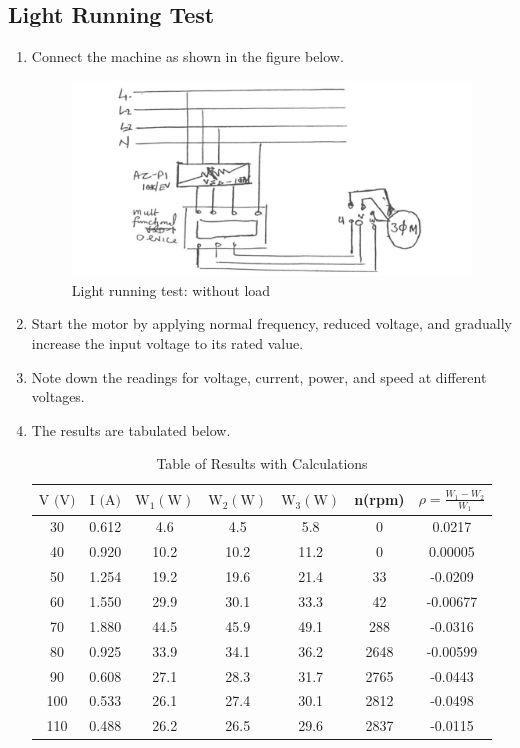 \documentclass[12pt,a4paper]{report}
\begin{document}
\subsection{Light Running Test}
\begin{enumerate}
    \item Connect the machine as shown in the figure below.
    \begin{figure}[H]
        \centering
        \includegraphics[width=\linewidth]{figure_5_5.jpeg}
        \caption{Light running test: without load}
        \label{fig_5}
    \end{figure}
    \item Start the motor by applying normal frequency, reduced voltage, and gradually increase the input voltage to its rated value.
    \item Note down the readings for voltage, current, power, and speed at different voltages.
    \item The results are tabulated below.

\begin{table}[H]
    \centering
    \caption{Table of Results with Calculations}
    \begin{tabular}{|c|c|c|c|c|c|c|}
    \hline
    \(\text{V (V)}\) & \(\text{I (A)}\) & \(\text{W}_1 (\text{W})\) & \(\text{W}_2 (\text{W})\) & \(\text{W}_3 (\text{W})\) & n(rpm) & \(\rho = \frac{W_1 - W_2}{W_1}\) \\ \hline
    30  & 0.612  & 4.6  & 4.5  & 5.8  & 0    & 0.0217   \\ \hline
    40  & 0.920  & 10.2 & 10.2 & 11.2 & 0    & 0.00005  \\ \hline
    50  & 1.254  & 19.2 & 19.6 & 21.4 & 33   & -0.0209  \\ \hline
    60  & 1.550  & 29.9 & 30.1 & 33.3 & 42   & -0.00677 \\ \hline
    70  & 1.880  & 44.5 & 45.9 & 49.1 & 288  & -0.0316  \\ \hline
    80  & 0.925  & 33.9 & 34.1 & 36.2 & 2648 & -0.00599 \\ \hline
    90  & 0.608  & 27.1 & 28.3 & 31.7 & 2765 & -0.0443  \\ \hline
    100 & 0.533  & 26.1 & 27.4 & 30.1 & 2812 & -0.0498  \\ \hline
    110 & 0.488  & 26.2 & 26.5 & 29.6 & 2837 & -0.0115  \\ \hline
    \end{tabular}
    \end{table}
    

\end{enumerate}
\end{document}
